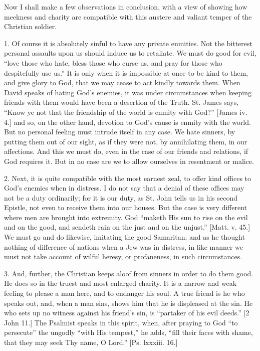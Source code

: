Now I shall make a few observations in conclusion, with a view of
showing how meekness and charity are compatible with this austere and
valiant temper of the Christian soldier.

1. Of course it is absolutely sinful to have any private enmities.
Not the bitterest personal assaults upon us should induce us to
retaliate. We must do good for evil, ``love those who hate, bless
those who curse us, and pray for those who despitefully use us.''
It is only when it is impossible at once to be kind to them, and give
glory to God, that we may cease to act kindly towards them. When David
speaks of hating God's enemies, it was under circumstances when
keeping friends with them would have been a desertion of the Truth.
St. James says, ``Know ye not that the friendship of the world is
enmity with God?'' [James iv. 4.] and so, on the other hand,
devotion to God's cause is enmity with the world. But no personal
feeling must intrude itself in any case. We hate sinners, by putting
them out of our sight, as if they were not, by annihilating them, in
our affections. And this we must do, even in the case of our friends
and relations, if God requires it. But in no case are we to allow
ourselves in resentment or malice.

2. Next, it is quite compatible with the most earnest zeal, to
offer kind offices to God's enemies when in distress. I do not say
that a denial of these offices may not be a duty ordinarily; for it is
our duty, as St. John tells us in his second Epistle, not even to
receive them into our houses. But the case is very different where men
are brought into extremity. God ``maketh His sun to rise on the
evil and on the good, and sendeth rain on the just and on the
unjust.'' [Matt. v. 45.] We must go and do likewise, imitating the
good Samaritan; and as he thought nothing of difference of nations
when a Jew was in distress, in like manner we must not take account of
wilful heresy, or profaneness, in such circumstances.

3. And, further, the Christian keeps aloof from sinners in order to
do them good. He does so in the truest and most enlarged charity. It
is a narrow and weak feeling to please a man here, and to endanger his
soul. A true friend is he who speaks out, and, when a man sins, shows
him that he is displeased at the sin. He who sets up no witness
against his friend's sin, is ``partaker of his evil deeds.''
[2 John 11.] The Psalmist speaks in this spirit, when, after praying to
God ``to persecute'' the ungodly ``with His tempest,''
he adds, ``fill their faces with shame, that they may seek Thy
name, O Lord.'' [Ps. lxxxiii. 16.]

